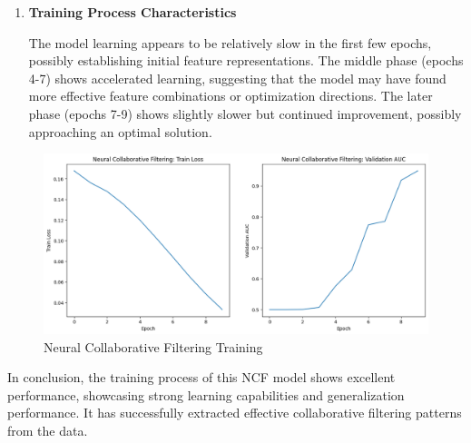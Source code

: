 \documentclass[9pt,twocolumn,twoside,lineno]{gsajnl}
\begin{document}
\begin{enumerate}
\item \textbf{Training Process Characteristics\newline}

The model learning appears to be relatively slow in the first few epochs, possibly establishing initial feature representations.
The middle phase (epochs 4-7) shows accelerated learning, suggesting that the model may have found more effective feature combinations or optimization directions.
The later phase (epochs 7-9) shows slightly slower but continued improvement, possibly approaching an optimal solution.


\end{enumerate}

\begin{figure}
    \centering
    \includegraphics[width=\linewidth]{material/5.png}
    \caption{Neural Collaborative Filtering Training}
    \label{fig:5}
\end{figure}

In conclusion, the training process of this NCF model shows excellent performance, showcasing strong learning capabilities and generalization performance. It has successfully extracted effective collaborative filtering patterns from the data.
\end{document}
